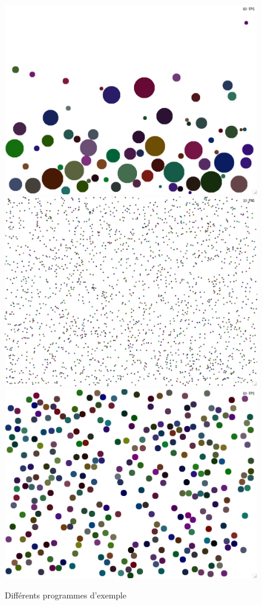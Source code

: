 \documentclass[a4paper]{scrartcl}
\begin{document}
\begin{figure}[h]
  \centering
  \includegraphics[scale = 0.2]{test0.pdf}
  \includegraphics[scale = 0.2]{test1.pdf}
  \includegraphics[scale = 0.2]{test2.pdf}
  \caption{Différents programmes d'exemple}
\end{figure}
\end{document}
